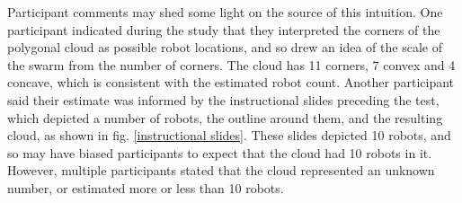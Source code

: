 Participant comments may shed some light on the source of this intuition. 
One participant indicated during the study that they interpreted the corners of the polygonal cloud as possible robot locations, and so drew an idea of the scale of the swarm from the number of corners. 
The cloud has 11 corners, 7 convex and 4 concave, which is consistent with the estimated robot count. 
Another participant said their estimate was informed by the instructional slides preceding the test, which depicted a number of robots, the outline around them, and the resulting cloud, as shown in fig. \ref{instructional slides}. 
These slides depicted 10 robots, and so may have biased participants to expect that the cloud had 10 robots in it. 
However, multiple participants stated that the cloud represented an unknown number, or estimated more or less than 10 robots.

